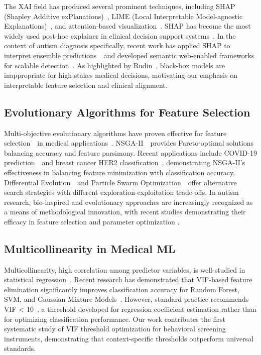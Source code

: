 \documentclass[pdflatex,sn-vancouver-num]{sn-jnl}
\begin{document}
The XAI field has produced several prominent techniques, including SHAP (Shapley Additive exPlanations)~\cite{ref17}, LIME (Local Interpretable Model-agnostic Explanations)~\cite{ref18}, and attention-based visualization~\cite{ref32}. SHAP has become the most widely used post-hoc explainer in clinical decision support systems~\cite{ref33}. In the context of autism diagnosis specifically, recent work has applied SHAP to interpret ensemble predictions~\cite{ref34}~and developed semantic web-enabled frameworks for scalable detection~\cite{ref20}. As highlighted by Rudin~\cite{ref16}, black-box models are inappropriate for high-stakes medical decisions, motivating our emphasis on interpretable feature selection and clinical alignment.

\subsection{Evolutionary Algorithms for Feature Selection}\label{evolutionary-algorithms-for-feature-selection}

Multi-objective evolutionary algorithms have proven effective for feature selection~\cite{ref35,ref36}~in medical applications~\cite{ref37,ref38}. NSGA-II~\cite{ref39}~provides Pareto-optimal solutions balancing accuracy and feature parsimony. Recent applications include COVID-19 prediction~\cite{ref37}~and breast cancer HER2 classification~\cite{ref38}, demonstrating NSGA-II's effectiveness in balancing feature minimization with classification accuracy. Differential Evolution~\cite{ref40}~and Particle Swarm Optimization~\cite{ref41}~offer alternative search strategies with different exploration-exploitation trade-offs. In autism research, bio-inspired and evolutionary approaches are increasingly recognized as a means of methodological innovation, with recent studies demonstrating their efficacy in feature selection and parameter optimization \cite{ref42,ref43,ref44}.

\subsection{Multicollinearity in Medical ML}\label{multicollinearity-in-medical-ml}

Multicollinearity, high correlation among predictor variables, is well-studied in statistical regression~\cite{ref14,ref45}. Recent research has demonstrated that VIF-based feature elimination significantly improves classification accuracy for Random Forest, SVM, and Gaussian Mixture Models~\cite{ref46}. However, standard practice recommends VIF \textless{} 10~\cite{ref15}, a threshold developed for regression coefficient estimation rather than for optimizing classification performance. Our work contributes the first systematic study of VIF threshold optimization for behavioral screening instruments, demonstrating that context-specific thresholds outperform universal standards.
\end{document}
